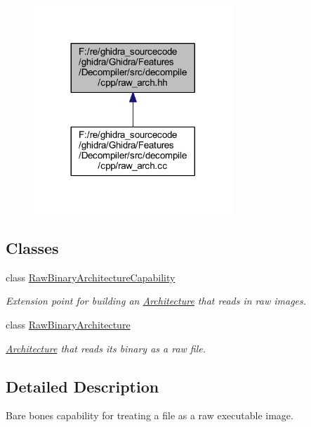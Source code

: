 \begin{figure}[H]
\begin{center}
\leavevmode
\includegraphics[width=212pt]{raw__arch_8hh__dep__incl}
\end{center}
\end{figure}
\subsection*{Classes}
\begin{DoxyCompactItemize}
\item 
class \mbox{\hyperlink{class_raw_binary_architecture_capability}{Raw\+Binary\+Architecture\+Capability}}
\begin{DoxyCompactList}\small\item\em Extension point for building an \mbox{\hyperlink{class_architecture}{Architecture}} that reads in raw images. \end{DoxyCompactList}\item 
class \mbox{\hyperlink{class_raw_binary_architecture}{Raw\+Binary\+Architecture}}
\begin{DoxyCompactList}\small\item\em \mbox{\hyperlink{class_architecture}{Architecture}} that reads its binary as a raw file. \end{DoxyCompactList}\end{DoxyCompactItemize}


\subsection{Detailed Description}
Bare bones capability for treating a file as a raw executable image. 

